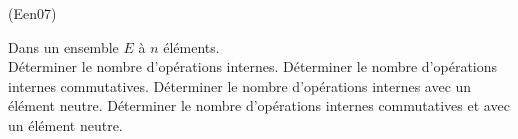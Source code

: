 \begin{tiny}(Een07)\end{tiny} 
Dans un ensemble $E$ à $n$ éléments.\\
Déterminer le nombre d'opérations internes.\newline
Déterminer le nombre d'opérations internes commutatives.\newline
Déterminer le nombre d'opérations internes avec un élément neutre.\newline
Déterminer le nombre d'opérations internes commutatives et avec un élément neutre.